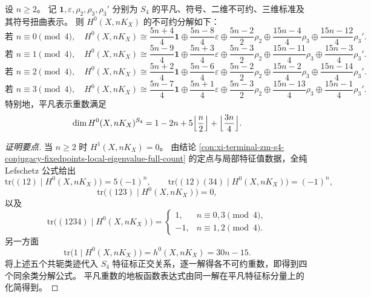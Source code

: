 \begin{conclusion}\label{con:xi-terminal-zm-s4-pluricanonical-irrep-decomposition-all-n}
设 \(n\ge 2\)。
记 \(\mathbf 1,\varepsilon,\rho_2,\rho_3,\rho_3'\) 分别为 \(S_4\) 的平凡、符号、二维不可约、三维标准及其符号扭曲表示。
则 \(H^0(X,nK_X)\) 的不可约分解如下：
\[
\text{若 }n\equiv 0\!\!\pmod 4,\quad
H^0(X,nK_X)\cong
\frac{5n+4}{4}\mathbf 1\oplus
\frac{5n-8}{4}\varepsilon\oplus
\frac{5n-2}{2}\rho_2\oplus
\frac{15n-4}{4}\rho_3\oplus
\frac{15n-12}{4}\rho_3'.
\]
\[
\text{若 }n\equiv 1\!\!\pmod 4,\quad
H^0(X,nK_X)\cong
\frac{5n-9}{4}\mathbf 1\oplus
\frac{5n+3}{4}\varepsilon\oplus
\frac{5n-3}{2}\rho_2\oplus
\frac{15n-11}{4}\rho_3\oplus
\frac{15n-3}{4}\rho_3'.
\]
\[
\text{若 }n\equiv 2\!\!\pmod 4,\quad
H^0(X,nK_X)\cong
\frac{5n+2}{4}\mathbf 1\oplus
\frac{5n-6}{4}\varepsilon\oplus
\frac{5n-2}{2}\rho_2\oplus
\frac{15n-2}{4}\rho_3\oplus
\frac{15n-14}{4}\rho_3'.
\]
\[
\text{若 }n\equiv 3\!\!\pmod 4,\quad
H^0(X,nK_X)\cong
\frac{5n-7}{4}\mathbf 1\oplus
\frac{5n+1}{4}\varepsilon\oplus
\frac{5n-3}{2}\rho_2\oplus
\frac{15n-13}{4}\rho_3\oplus
\frac{15n-1}{4}\rho_3'.
\]
特别地，平凡表示重数满足
\[
\dim H^0(X,nK_X)^{S_4}
=1-2n+5\Bigl\lfloor\frac n2\Bigr\rfloor+\Bigl\lfloor\frac{3n}{4}\Bigr\rfloor.
\]
\end{conclusion}
\begin{proof}[证明要点]
当 \(n\ge 2\) 时 \(H^1(X,nK_X)=0\)。
由结论 \ref{con:xi-terminal-zm-s4-conjugacy-fixedpoints-local-eigenvalue-full-count} 的定点与局部特征值数据，全纯 Lefschetz 公式给出
\[
\mathrm{tr}\!\bigl((12)\mid H^0(X,nK_X)\bigr)=5(-1)^n,\qquad
\mathrm{tr}\!\bigl((12)(34)\mid H^0(X,nK_X)\bigr)=(-1)^n,
\]
\[
\mathrm{tr}\!\bigl((123)\mid H^0(X,nK_X)\bigr)=0,
\]
以及
\[
\mathrm{tr}\!\bigl((1234)\mid H^0(X,nK_X)\bigr)=
\begin{cases}
1,& n\equiv 0,3\pmod 4,\\
-1,& n\equiv 1,2\pmod 4.
\end{cases}
\]
另一方面
\[
\mathrm{tr}\!\bigl(1\mid H^0(X,nK_X)\bigr)=h^0(X,nK_X)=30n-15.
\]
将上述五个共轭类迹代入 \(S_4\) 特征标正交关系，逐一解得各不可约重数，即得到四个同余类分解公式。
平凡重数的地板函数表达式由同一解在平凡特征标分量上的化简得到。
\end{proof}

